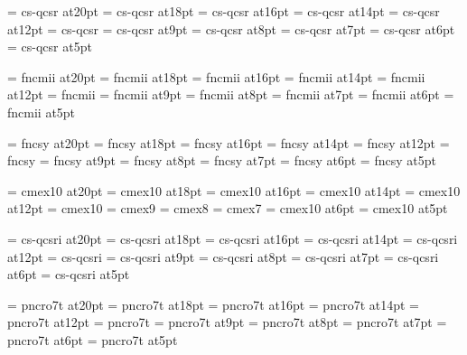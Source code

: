 
\font\twentyrm=     cs-qcsr at20pt
\font\eighteenrm=   cs-qcsr at18pt
\font\sixteenrm=    cs-qcsr at16pt
\font\fourteenrm=   cs-qcsr at14pt
\font\twelverm=     cs-qcsr at12pt
\font\tenrm=        cs-qcsr
\font\ninerm=       cs-qcsr at9pt
\font\eightrm=      cs-qcsr at8pt
\font\sevenrm=      cs-qcsr at7pt
\font\sixrm=        cs-qcsr at6pt
\font\fiverm=       cs-qcsr at5pt

\font\twentyi=      fncmii at20pt
\font\eighteeni=    fncmii at18pt
\font\sixteeni=     fncmii at16pt
\font\fourteeni=    fncmii at14pt
\font\twelvei=      fncmii at12pt
\font\teni=         fncmii
\font\ninei=        fncmii at9pt
\font\eighti=       fncmii at8pt
\font\seveni=       fncmii at7pt
\font\sixi=         fncmii at6pt
\font\fivei=        fncmii at5pt

\font\twentysy=     fncsy at20pt
\font\eighteensy=   fncsy at18pt
\font\sixteensy=    fncsy at16pt
\font\fourteensy=   fncsy at14pt
\font\twelvesy=     fncsy at12pt
\font\tensy=        fncsy
\font\ninesy=       fncsy at9pt
\font\eightsy=      fncsy at8pt
\font\sevensy=      fncsy at7pt
\font\sixsy=        fncsy at6pt
\font\fivesy=       fncsy at5pt

\font\twentyex=     cmex10 at20pt
\font\eighteenex=   cmex10 at18pt
\font\sixteenex=    cmex10 at16pt
\font\fourteenex=   cmex10 at14pt
\font\twelveex=     cmex10 at12pt
\font\tenex=        cmex10
\font\nineex=       cmex9
\font\eightex=      cmex8
\font\sevenex=      cmex7
\font\sixex=        cmex10 at6pt
\font\fiveex=       cmex10 at5pt

\font\twentyit=     cs-qcsri at20pt
\font\eighteenit=   cs-qcsri at18pt
\font\sixteenit=    cs-qcsri at16pt
\font\fourteenit=   cs-qcsri at14pt
\font\twelveit=     cs-qcsri at12pt
\font\tenit=        cs-qcsri
\font\nineit=       cs-qcsri at9pt
\font\eightit=      cs-qcsri at8pt
\font\sevenit=      cs-qcsri at7pt
\font\sixit=        cs-qcsri at6pt
\font\fiveit=       cs-qcsri at5pt

\font\twentysl=     pncro7t at20pt
\font\eighteensl=   pncro7t at18pt
\font\sixteensl=    pncro7t at16pt
\font\fourteensl=   pncro7t at14pt
\font\twelvesl=     pncro7t at12pt
\font\tensl=        pncro7t
\font\ninesl=       pncro7t at9pt
\font\eightsl=      pncro7t at8pt
\font\sevensl=      pncro7t at7pt
\font\sixsl=        pncro7t at6pt
\font\fivesl=       pncro7t at5pt

